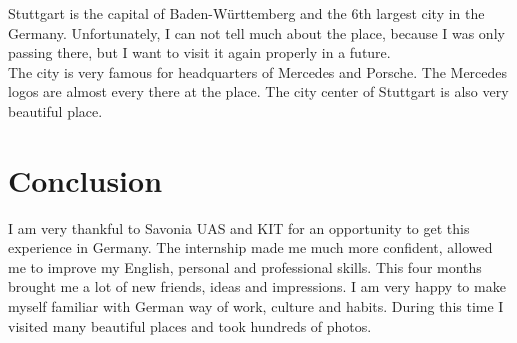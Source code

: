 \documentclass[english]{article}
\begin{document}
Stuttgart is the capital of Baden-Württemberg and the 6th largest city in the Germany. Unfortunately, I can not tell much about the place, because I was only passing there, but I want to visit it again properly in a future.\\

The city is very famous for headquarters of Mercedes and Porsche. The Mercedes logos are almost every there at the place. The city center of Stuttgart is also very beautiful place.

\section{Conclusion}
I am very thankful to Savonia UAS and KIT for an opportunity to get this experience in Germany. The internship made me much more confident, allowed me to improve my English, personal and professional skills. This four months brought me a lot of new friends, ideas and impressions. I am very happy to make myself familiar with German way of work, culture and habits. During this time I visited many beautiful places and took hundreds of photos.
\end{document}
